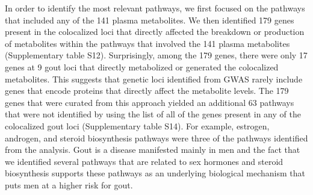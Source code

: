 \documentclass[a4paper,10pt]{article}
\begin{document}
In order to identify the most relevant pathways, we first focused on the pathways that included any of the 141 plasma metabolites.
We then identified 179 genes present in the colocalized loci that directly affected the breakdown or production of metabolites within the pathways that involved the 141 plasma metabolites (Supplementary table S12).
Surprisingly, among the 179 genes, there were only 17 genes at 9 gout loci that directly metabolized or generated the colocalized metabolites.
This suggests that genetic loci identified from GWAS rarely include genes that encode proteins that directly affect the metabolite levels.
The 179 genes that were curated from this approach yielded an additional 63 pathways that were not identified by using the list of all of the genes present in any of the colocalized gout loci (Supplementary table S14).
For example, estrogen, androgen, and steroid biosynthesis pathways were three of the pathways identified from the analysis.
Gout is a disease manifested mainly in men\citep{dalbeth_gout_2021,chen-xu_contemporary_2019} and the fact that we identified several pathways that are related to sex hormones and steroid biosynthesis supports these pathways as an underlying biological mechanism that puts men at a higher risk for gout.
\\
\end{document}
